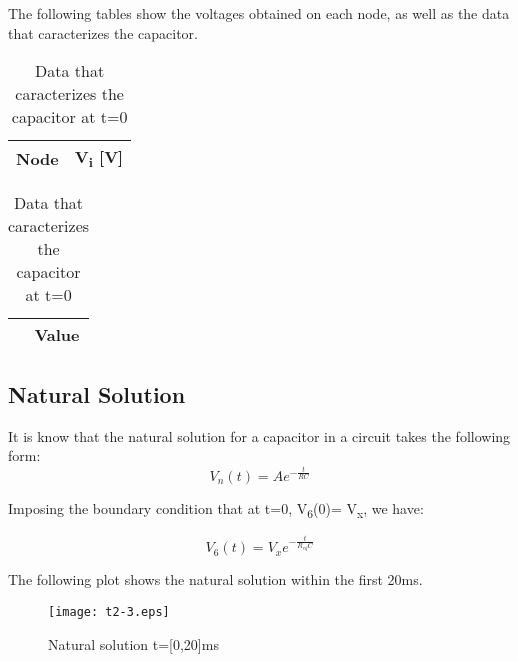 The following tables show the voltages obtained on each node, as well as the data that caracterizes the capacitor.

\begin{table}[!htb]
    \begin{minipage}{.5\linewidth}
      
      \centering
        \begin{tabular}{|c|c|}
        \hline    
        {\bf Node} & {\bf V\textsubscript{i} [V]} \\ \hline
        
        \end{tabular}
        \caption{Voltage values on each node (t=0)}
    \end{minipage}%
    \begin{minipage}{.5\linewidth}
      \centering
        
        \begin{tabular}{|c|c|}
        \hline    
        {\bf } & {\bf Value} \\ \hline
        
        \end{tabular}
        \caption{Data that caracterizes the capacitor at t=0}
    \end{minipage} 
\end{table}
\newpage
\subsection{Natural Solution}
It is know that the natural solution for a capacitor in a circuit takes the following form:
\begin{equation}
 V_n(t)=A e^{- \frac{t}{RC}}
\end{equation}

Imposing the boundary condition that at t=0, V\textsubscript{6}(0)= V\textsubscript x, we have:

\begin{equation}
 V_6(t)=V_x e^{- \frac{t}{R_{eq} C}}
\end{equation}

The following plot shows the natural solution within the first 20ms.
\begin{figure}[h] \centering
\texttt{[image: t2-3.eps]}
\caption{Natural solution t=[0,20]ms}
\label{fig:forced}
\end{figure}
